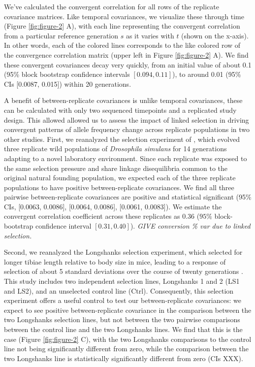 \documentclass[11pt]{article}
\newcommand{\gc}[1]{{\it \color{red} #1 } }
\begin{document}
We've calculated the convergent correlation for all rows of the replicate
covariance matrices. Like temporal covariances, we visualize these through time
(Figure \ref{fig:figure-2} A), with each line representing the convergent
correlation from a particular reference generation $s$ as it varies with $t$
(shown on the x-axis). In other words, each of the colored lines corresponds to
the like colored row of the convergence correlation matrix (upper left in
Figure \ref{fig:figure-2} A). We find these convergent covariances decay very
quickly, from an initial value of about 0.1 (95\% block bootstrap confidence
intervals $[0.094, 0.11]$), to around 0.01 (95\% CIs [0.0087, 0.015]) within 20
generations.

A benefit of between-replicate covariances is unlike temporal covariances,
these can be calculated with only two sequenced timepoints and a replicated
study design. This allowed allowed us to assess the impact of linked selection
in driving convergent patterns of allele frequency change across replicate
populations in two other studies. First, we reanalyzed the selection experiment
of \textcite{Kelly2019-dc}, which evolved three replicate wild populations of
\emph{Drosophila simulans} for 14 generations adapting to a novel laboratory
environment. Since each replicate was exposed to the same selection pressure
and share linkage disequilibria common to the original natural founding
population, we expected each of the three replicate populations to have
positive between-replicate covariances. We find all three pairwise
between-replicate covariances are positive and statistical significant (95\%
CIs, [0.0063, 0.0086], [0.0064, 0.0086], [0.0061, 0.0083]). We estimate the
convergent correlation coefficient across these replicates as 0.36 ($95\%$
block-bootstrap confidence interval $[0.31, 0.40]$). \gc{GIVE conversion \% var
due to linked selection. }

Second, we reanalyzed the Longshanks selection experiment, which selected for
longer tibiae length relative to body size in mice, leading to a response of
selection of about 5 standard deviations over the course of twenty generations
\parencite{Castro2019-uk}. This study includes two independent selection lines,
Longshanks 1 and 2 (LS1 and LS2), and an unselected control line (Ctrl).
Consequently, this selection experiment offers a useful control to test our
between-replicate covariances: we expect to see positive between-replicate
covariance in the comparison between the two Longshanks selection lines, but
not between the two pairwise comparisons between the control line and the two
Longshanks lines. We find that this is the case (Figure \ref{fig:figure-2} C),
with the two Longshanks comparisons to the control line not being significantly
different from zero, while the comparison between the two Longshanks line is
statistically significantly different from zero (CIs XXX).
\end{document}
